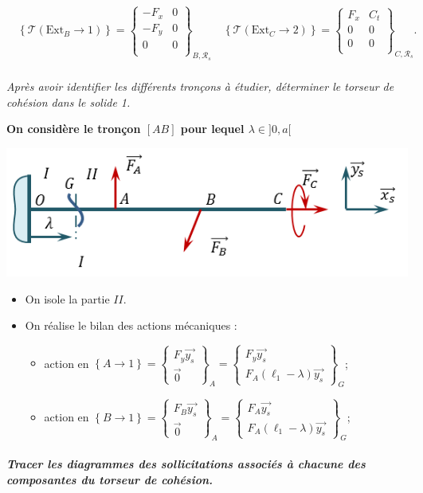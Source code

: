 \documentclass[10pt,fleqn]{article} %
\begin{document}
\begin{multicols}{2}
$$\quad
\left\{\mathcal{T} \left( \text{Ext}_B \rightarrow 1\right) \right\} =
\begin{Bmatrix}
-F_x & 0 \\
-F_y& 0 \\
0 & 0 \\
\end{Bmatrix}_{B,\mathcal{R}_s}
\quad
\left\{\mathcal{T} \left( \text{Ext}_C \rightarrow 2\right) \right\} =
\begin{Bmatrix}
F_x & C_t \\
0 & 0 \\
0 & 0 \\
\end{Bmatrix}_{C,\mathcal{R}_s}.
$$

\subparagraph{}
\textit{Après avoir identifier les différents tronçons à étudier, déterminer le torseur de cohésion dans le solide 1.}

\textbf{On considère le tronçon $[AB]$ pour lequel $\lambda \in ]0,a[$}
\begin{center}
\includegraphics[width=.5\linewidth]{images/corr_01}
\end{center}
\begin{itemize}
\item On isole la partie $II$. 
\item On réalise le bilan des actions mécaniques : 
\begin{itemize}
\item action en $\left\{ A\rightarrow 1 \right\}= \begin{Bmatrix} F_y\overrightarrow{y_s}\\
\overrightarrow{0}\end{Bmatrix}_A = \begin{Bmatrix} F_y\overrightarrow{y_s}\\
 F_A\left( \ell_1 - \lambda \right)\overrightarrow{y_s}\end{Bmatrix}_G$;
\item action en $\left\{ B\rightarrow 1 \right\}= \begin{Bmatrix} F_B\overrightarrow{y_s}\\
\overrightarrow{0}\end{Bmatrix}_A = \begin{Bmatrix} F_A\overrightarrow{y_s}\\
 F_A\left( \ell_1 - \lambda \right)\overrightarrow{y_s}\end{Bmatrix}_G$;
\end{itemize}
\end{itemize}

\subparagraph{Tracer les diagrammes des sollicitations associés à chacune des composantes du torseur de cohésion.}

\ifprof
\else
\end{multicols}
\fi
\end{document}
